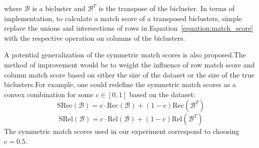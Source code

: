 \noindent where $\mathcal{B}$ is a bicluster and $\mathcal{B}^T$ is the transpose of the bicluster.
In terms of implementation, to calculate a match score of a transposed biclusters, simple replace the unions and intersections of rows in Equation~\ref{equation:match_score} with the respective operation on columns of the biclusters.

A potential generalization of the symmetric match scores is also proposed.The method of improvement would be to weight the influence of row match score and column match score based on either the size of the dataset or the size of the true biclusters.For example, one could redefine the symmetric match scores as a convex combination for some $c \in [0, 1]$ based on the dataset:
    \begin{equation}
        \text{SRec}(\mathcal{B}) = c \cdot \text{Rec}(\mathcal{B}) + (1-c) \text{Rec}(\mathcal{B}^T)
    \end{equation}
    \begin{equation}
        \text{SRel}(\mathcal{B}) = c \cdot \text{Rel}(\mathcal{B}) + (1-c) \text{Rel}(\mathcal{B}^T)
    \end{equation}
    The symmetric match scores used in our experiment correspond to choosing $c=0.5$.



\begin{comment}
There a sets of extracted biclusters$\mathcal{X}$\[x_1,x_{2},...,x_{p}\]and a sets of ground truth biclusters $\mathcal{Y}$\[y_{1},y_{2},...,y_{q}\] . 
Here, a bicluster is supposed to be a set of index pairs (i, j) to identify matrix elements,
i.e. expression values, which are grouped together. Then the similarity index matrix I is given as

{I_{rs}} = Ja \[({x}_r, {Y}_s)\] ,
where r ∈ {1, . . . , p} and s ∈ {1, . . . , q} and Ja is the Jaccard index. These indices measure the
similarity of two biclusters – here the similarity between biclusters \[({x}_r\] and \[{Y}_s)\]

They use the Munkres algorithm implemented in the R package to compute an optimal assignment of biclusters \[{X}_1, . . . , {X}_q\] to the true biclusters \[{Y}_1, . . . , {Y}_p\].
The optimal assignment is given as a list of pairs
((\[{r}_1, {s}_1),... , ({r}_{min(p,q)},{s}_{min(p,q)}\])
The optimal score is given as
M = \sum(\[{A}_r_i, {B}_r_i\])
The final consensus score s is computed as
s= \frac{M}{max(p,q)}

\end{comment}

